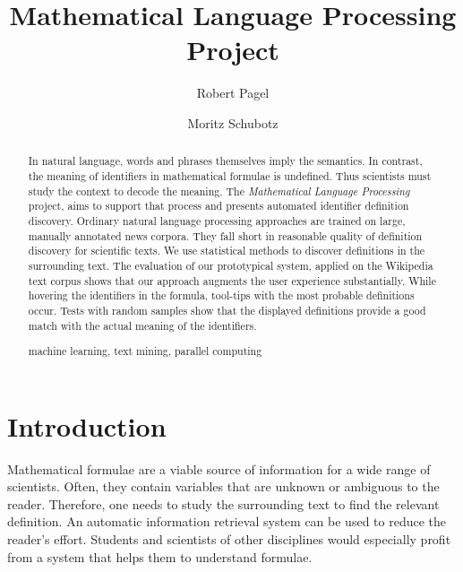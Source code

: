 \documentclass[runningheads]{llncs}
\newcommand{\keywords}[1]{\par\addvspace\baselineskip
\noindent\keywordname\enspace\ignorespaces#1}
\begin{document}
\mainmatter

\title{Mathematical Language Processing \\ Project}

\author{Robert Pagel \and Moritz Schubotz}



\maketitle


\begin{abstract}
In natural language, words and phrases themselves imply the semantics.
In contrast, the meaning of identifiers in mathematical formulae is undefined.
Thus scientists must study the context to decode the meaning.
The \emph{Mathematical Language Processing} project, aims to support that process and
presents automated identifier definition discovery.
Ordinary natural language processing approaches are trained on large, manually annotated news
corpora.
They fall short in reasonable quality of definition discovery for scientific texts.
We use statistical methods to discover definitions in the surrounding text.
The evaluation of our prototypical system, applied on the Wikipedia text
corpus shows that our approach augments the user experience
substantially.
While hovering the identifiers in the formula, tool-tips with the most probable definitions
occur.
Tests with random samples show that the displayed definitions provide
a good match with the actual meaning of the identifiers.   
\keywords{machine learning, text mining, parallel computing}
\end{abstract}


\section{Introduction}

Mathematical formulae are a viable source of information for a wide range of
scientists.
Often, they contain variables that are unknown or ambiguous to the reader.
Therefore, one needs to study the surrounding text to find the relevant definition.
An automatic information retrieval system can be used to reduce the reader's
effort.
Students and scientists of other disciplines would especially profit from a 
system that helps them to understand formulae.
\end{document}
